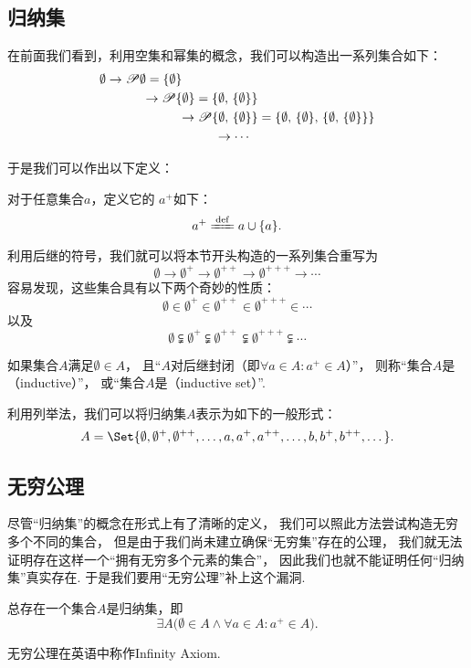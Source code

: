 \subsection{归纳集}
在前面我们看到，利用空集和幂集的概念，我们可以构造出一系列集合如下：
\[\begin{aligned}
\emptyset
&\to
\Powerset\emptyset = \NaturalSet{1} \\
&\hspace{1cm}\to
\Powerset\NaturalSet{1} = \NaturalSet{2} \\
&\hspace{2cm}\to
\Powerset\NaturalSet{2} = \NaturalSet{3} \\
&\hspace{3cm}\to
\dotsb
\end{aligned}\]

于是我们可以作出以下定义：
\begin{definition}[后继]\label{definition:集合论.后继的定义}
对于任意集合\(a\)，定义它的 \(a^+\)如下：\[
a^+ \defeq a \cup \{a\}.
\]
\end{definition}
利用后继的符号，我们就可以将本节开头构造的一系列集合重写为\[
\emptyset
\to \emptyset^+
\to \emptyset^{++}
\to \emptyset^{+++}
\to \dotsb
\]容易发现，这些集合具有以下两个奇妙的性质：\[
\emptyset
\in \emptyset^+
\in \emptyset^{++}
\in \emptyset^{+++}
\in \dotsb
\]以及\[
\emptyset
\subsetneqq \emptyset^+
\subsetneqq \emptyset^{++}
\subsetneqq \emptyset^{+++}
\subsetneqq \dotsb
\]

\begin{definition}[归纳集]\label{definition:集合论.归纳集的定义}
如果集合\(A\)满足\(\emptyset \in A\)，%
且“\(A\)对后继封闭（即\(\forall a \in A : a^+ \in A\)）”，%
则称“集合\(A\)是（inductive）”，%
或“集合\(A\)是（inductive set）”.
\end{definition}
利用列举法，我们可以将归纳集\(A\)表示为如下的一般形式：\[
A = \Set{
 \emptyset, \emptyset^+, \emptyset^{++}, \dotsc,
 a, a^+, a^{++}, \dotsc,
 b, b^+, b^{++}, \dotsc
}.
\]

\subsection{无穷公理}
尽管“归纳集”的概念在形式上有了清晰的定义，%
我们可以照此方法尝试构造无穷多个不同的集合，%
但是由于我们尚未建立确保“无穷集”存在的公理，%
我们就无法证明存在这样一个“拥有无穷多个元素的集合”，%
因此我们也就不能证明任何“归纳集”真实存在.
于是我们要用“无穷公理”补上这个漏洞.
\begin{axiom}[无穷公理]
总存在一个集合\(A\)是归纳集，即\[
\exists A \bigl(
  \emptyset \in A
  \land
  \forall a \in A : a^+ \in A
\bigr).
\]
\end{axiom}
无穷公理在英语中称作Infinity Axiom.

